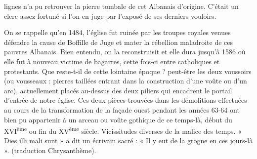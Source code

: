 
lignes n'a pu retrouver la pierre tombale de cet Albanais
d'origine. C'était un clerc assez fortuné si l'on en juge par
l'exposé de ses derniers vouloirs.

\par

On se rappelle qu'en 1484, l'église fut ruinée par les
troupes royales venues défendre la cause de Boffille de
Juge et mater la rébellion maladroite de ces pauvres
Albanais. Bien entendu, on la reconstruisit et elle dura
jusqu'à 1586 où elle fut à nouveau victime de bagarres,
cette fois-ci entre catholiques et protestants. Que reste-t-il
de cette lointaine époque ? peut-être les deux voussoirs
(ou vousseaux : pierres taillées entrant dans la construction
d'une voûte ou d'un arc), actuellement placés au-dessus
des deux piliers qui encadrent le portail d'entrée de notre
église. Ces deux pièces trouvées dans les démolitions
effectuées au cours de la transformation de la façade ouest
pendant les années 63-64 ont bien pu appartenir à un arceau
ou voûte gothique de ce temps-là, début du XVI\textsuperscript{ème}
ou fin du XV\textsuperscript{ème} siècle. Vicissitudes diverses de la malice des
temps. « Dies illi mali sunt » a dit un écrivain sacré :
« Il y eut de la grogne en ces jours-là ». (traduction
Chrysanthème).

